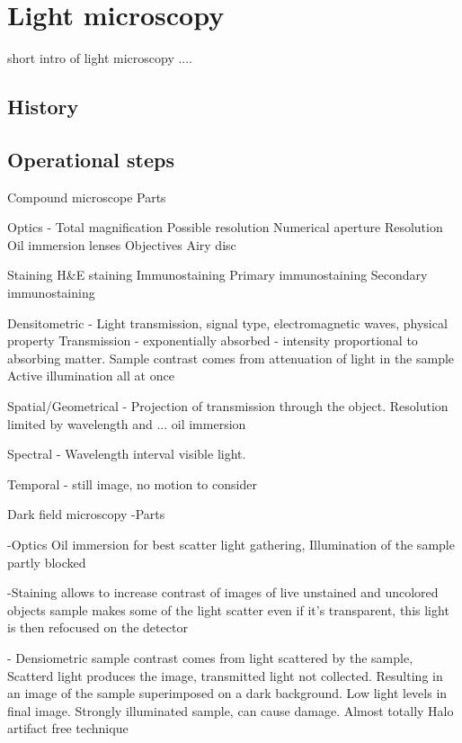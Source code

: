 \section{Light microscopy}
short intro of light microscopy ....

\subsection*{History}


\subsection*{Operational steps}


Compound microscope
	Parts

	Optics - 
		Total magnification
		Possible resolution
		Numerical aperture 
		Resolution 
		Oil immersion lenses
		Objectives 
		Airy disc

	Staining
		H\&E staining 
		Immunostaining
			Primary immunostaining
			Secondary immunostaining

	Densitometric - Light transmission, signal type, electromagnetic waves, 
					physical property Transmission - exponentially absorbed - intensity proportional to absorbing matter. Sample contrast comes from attenuation of light in the sample
					Active illumination all at once
	
	Spatial/Geometrical - Projection of transmission through the object. Resolution limited by wavelength and ... oil immersion 

	Spectral - Wavelength interval visible light. 

	Temporal -  still image, no motion to consider




Dark field microscopy
	-Parts

	-Optics
	Oil immersion for best scatter light gathering, Illumination of the sample partly blocked 
	
	-Staining
	allows to increase contrast of images of live unstained and uncolored objects sample makes some of the light scatter even if it's transparent, this light is then refocused on the detector 

	- Densiometric 
	sample contrast comes from light scattered by the sample, Scatterd light produces the 				image, transmitted light not collected. Resulting in an image of the sample superimposed on a dark background. Low light levels in final image. Strongly illuminated sample, can cause damage. Almost totally Halo artifact free technique 

